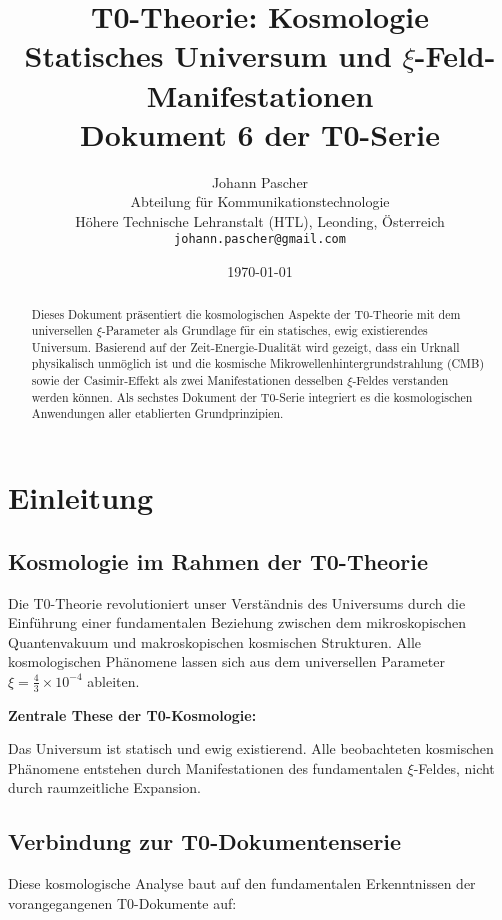 \documentclass[12pt,a4paper]{article}
\title{\textbf{T0-Theorie: Kosmologie}\\[0.5cm]
	\large Statisches Universum und $\xi$-Feld-Manifestationen\\[0.3cm]
	\normalsize Dokument 6 der T0-Serie}
\author{Johann Pascher\\
	Abteilung für Kommunikationstechnologie\\
	Höhere Technische Lehranstalt (HTL), Leonding, Österreich\\
	\texttt{johann.pascher@gmail.com}}
\date{\today}
\newcommand{\xipar}{\xi}
\begin{document}
	
	\maketitle
	
	\begin{abstract}
		Dieses Dokument präsentiert die kosmologischen Aspekte der T0-Theorie mit dem universellen $\xi$-Parameter als Grundlage für ein statisches, ewig existierendes Universum. Basierend auf der Zeit-Energie-Dualität wird gezeigt, dass ein Urknall physikalisch unmöglich ist und die kosmische Mikrowellenhintergrundstrahlung (CMB) sowie der Casimir-Effekt als zwei Manifestationen desselben $\xi$-Feldes verstanden werden können. Als sechstes Dokument der T0-Serie integriert es die kosmologischen Anwendungen aller etablierten Grundprinzipien.
	\end{abstract}
	
	\tableofcontents
	\newpage
	
	\section{Einleitung}
	
	\subsection{Kosmologie im Rahmen der T0-Theorie}
	
	Die T0-Theorie revolutioniert unser Verständnis des Universums durch die Einführung einer fundamentalen Beziehung zwischen dem mikroskopischen Quantenvakuum und makroskopischen kosmischen Strukturen. Alle kosmologischen Phänomene lassen sich aus dem universellen Parameter $\xipar = \frac{4}{3} \times 10^{-4}$ ableiten.
	
	\begin{keyresult}
		\textbf{Zentrale These der T0-Kosmologie:}
		
		Das Universum ist statisch und ewig existierend. Alle beobachteten kosmischen Phänomene entstehen durch Manifestationen des fundamentalen $\xi$-Feldes, nicht durch raumzeitliche Expansion.
	\end{keyresult}
	
	\subsection{Verbindung zur T0-Dokumentenserie}
	
	Diese kosmologische Analyse baut auf den fundamentalen Erkenntnissen der vorangegangenen T0-Dokumente auf:
	
\end{document}
